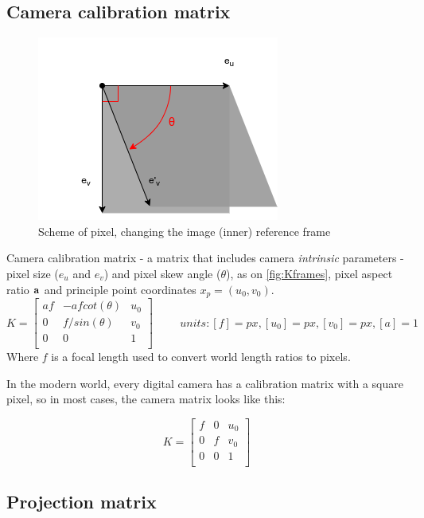 \subsection{Camera calibration matrix}
\begin{figure}[h]
    \centering
    \includegraphics[width=.6\textwidth]{graphics/pixel.png}
    \caption{Scheme of pixel, changing the image (inner) reference frame}
    \label{fig:Kframes}
\end{figure}
Camera calibration matrix - a matrix that includes camera \textit{intrinsic} parameters - pixel size ($e_u$ and $e_v$) and pixel skew angle ($\theta$), as on \autoref{fig:Kframes}, pixel aspect ratio $\bf{a}$ and principle point coordinates $x_p = (u_0, v_0)$.
$$
K = \begin{bmatrix}
    af & -a f cot(\theta) & u_0 \\
    0 & f / sin(\theta) & v_0 \\
    0 & 0 & 1 \\
\end{bmatrix} \hspace{1cm} units: [f]=px, [u_0]=px, [v_0]=px, [a]=1
$$ 
Where $f$ is a focal length used to convert world length ratios to pixels.

In the modern world, every digital camera has a calibration matrix with a square pixel, so in most cases, the camera matrix looks like this:

$$
K = \begin{bmatrix}
    f & 0 & u_0 \\
    0 & f & v_0 \\
    0 & 0 & 1 \\
\end{bmatrix}
$$

\subsection{Projection matrix}

